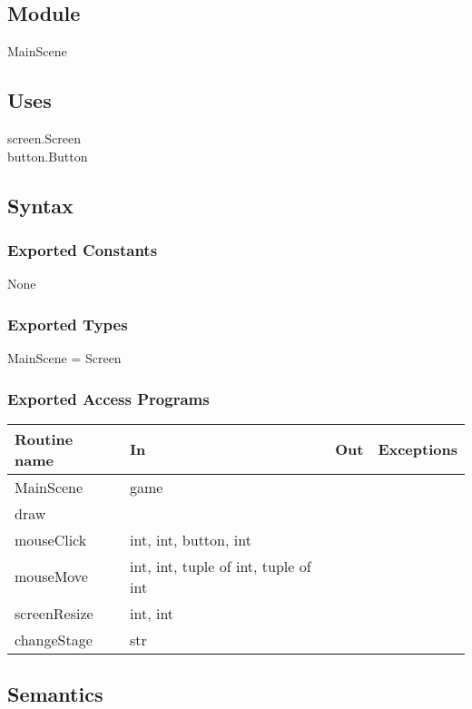 \documentclass{article}
\begin{document}
\subsection{Module}
MainScene

\subsection {Uses}
screen.Screen\\
button.Button

\subsection {Syntax}

\subsubsection {Exported Constants}
None

\subsubsection {Exported Types}
MainScene = Screen

\subsubsection {Exported Access Programs}
\begin{table}[!htbp]
\begin{tabular}{| l | l | l | l |}
\hline
\textbf{Routine name} & \textbf{In} & \textbf{Out} & \textbf{Exceptions}\\
\hline
MainScene & game & ~ & ~\\
\hline
draw & ~ & ~& ~\\
\hline
mouseClick & int, int, button, int & ~& ~\\
\hline
mouseMove & int, int, tuple of int, tuple of int & ~& ~\\
\hline
screenResize & int, int & ~& ~\\
\hline
changeStage & str & ~& ~\\
\hline
\end{tabular}

\end{table}
\FloatBarrier

\subsection {Semantics}
\end{document}

